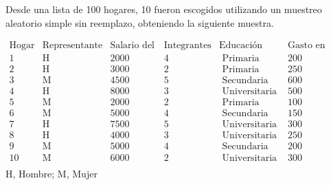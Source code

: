 \addpoints
\question[20] Desde una lista de 100 hogares, 10 fueron escogidos utilizando un muestreo aleatorio simple sin reemplazo, obteniendo la siguiente muestra.

\begin{center}
$\begin{array}{cccccc}
\text{Hogar} & \text{Representante} & \text{Salario del hogar} & \text{Integrantes} & \text{Educación} & \text{Gasto en transporte} \\
\hline 
1 & \mathrm{H} & 2000 & 4 & \text { Primaria } & 200 \\
2 & \mathrm{H} & 3000 & 2 & \text { Primaria } & 250 \\
3 & \mathrm{M} & 4500 & 5 & \text { Secundaria } & 600 \\
4 & \mathrm{H} & 8000 & 3 & \text { Universitaria } & 500 \\
5 & \mathrm{M} & 2000 & 2 & \text { Primaria } & 100 \\
6 & \mathrm{M} & 5000 & 4 & \text { Secundaria } & 150 \\
7 & \mathrm{H} & 7500 & 5 & \text { Universitaria } & 300 \\
8 & \mathrm{H} & 4000 & 3 & \text { Universitaria } & 250 \\
9 & \mathrm{M} & 5000 & 4 & \text { Secundaria } & 200 \\
10 & \mathrm{M} & 6000 & 2 & \text { Universitaria } & 300 \\
\end{array}$
H, Hombre; M, Mujer
\end{center}
\noaddpoints
{}
